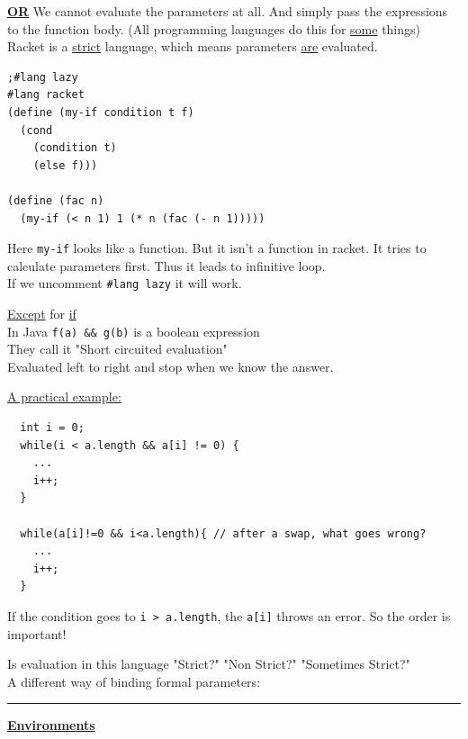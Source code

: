\documentclass{article}
\begin{document}
\begin{flushleft}
\begin{flushleft}
\textbf{\underline{OR}} We cannot evaluate the parameters at all. And simply pass the expressions to the function body. (All programming languages do this for \underline{some} things)\\
Racket is a \underline{strict} language, which means parameters \underline{are} evaluated.
\end{flushleft}

\begin{verbatim}
;#lang lazy
#lang racket
(define (my-if condition t f)
  (cond
    (condition t)
    (else f)))
    
(define (fac n)
  (my-if (< n 1) 1 (* n (fac (- n 1)))))
\end{verbatim}
Here \verb|my-if| looks like a function. But it isn't a function in racket. It tries to calculate parameters first. Thus it leads to infinitive loop.\\
If we uncomment \verb|#lang lazy| it will work. 

\begin{flushleft}
\underline{Except} for \underline{if}\\
In Java \verb|f(a) && g(b)| is a boolean expression\\
They call it "Short circuited evaluation"\\
Evaluated left to right and stop when we know the answer.
\end{flushleft}

\begin{flushleft}
 
\underline{A practical example:}
\begin{verbatim}
  int i = 0;
  while(i < a.length && a[i] != 0) {
    ...
    i++;
  }
  
  while(a[i]!=0 && i<a.length){	// after a swap, what goes wrong?
    ...
    i++;
  }
\end{verbatim}
If the condition goes to \verb|i > a.length|, the \verb|a[i]| throws an error. So the order is important!
\end{flushleft}

\begin{flushleft}
Is evaluation in this language "Strict?" "Non Strict?" "Sometimes Strict?"\\
A different way of binding formal parameters: \noindent\rule{3cm}{0.4pt}
\end{flushleft}
\begin{center}
\textbf{\underline{Environments}}
\end{center}


\end{flushleft}
\end{document}
